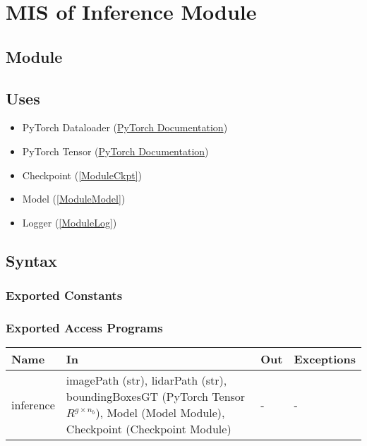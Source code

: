 \documentclass[12pt, titlepage]{article}
\begin{document}
\newpage

\section{MIS of Inference Module} \label{ModuleInfer} 

\subsection{Module}



\subsection{Uses}
\begin{itemize}
  \item PyTorch Dataloader (\href{https://pytorch.org/tutorials/beginner/basics/data_tutorial.html}{PyTorch Documentation})
  \item PyTorch Tensor (\href{https://pytorch.org/docs/stable/tensors.html}{PyTorch Documentation})
  \item Checkpoint (\ref{ModuleCkpt})
  \item Model (\ref{ModuleModel})
  \item Logger (\ref{ModuleLog})
\end{itemize}

\subsection{Syntax}



\subsubsection{Exported Constants}



\subsubsection{Exported Access Programs}

\begin{center}
\begin{tabular}{p{2cm}|p{6cm}|p{2cm}|p{2cm}}
\hline
\textbf{Name} & \textbf{In} & \textbf{Out} & \textbf{Exceptions} \\
\hline
inference & imagePath (str), lidarPath (str), boundingBoxesGT (PyTorch Tensor $R^{g\times{}n_{b}}$), Model (Model Module), Checkpoint (Checkpoint Module) & - & - \\
\hline
\end{tabular}
\end{center}
\end{document}
